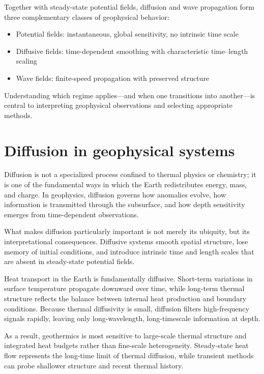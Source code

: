 Together with steady-state potential fields, diffusion and wave propagation form three complementary classes of geophysical behavior:
\begin{itemize}
    \item Potential fields: instantaneous, global sensitivity, no intrinsic time
    scale
    \item Diffusive fields: time-dependent smoothing with characteristic
    time--length scaling
    \item Wave fields: finite-speed propagation with preserved structure
\end{itemize}

Understanding which regime applies—and when one transitions into another—is central to interpreting geophysical observations and selecting appropriate methods.

\section{Diffusion in geophysical systems}

Diffusion is not a specialized process confined to thermal physics or chemistry; it is one of the fundamental ways in which the Earth redistributes energy, mass, and charge. In geophysics, diffusion governs how anomalies evolve, how information is transmitted through the subsurface, and how depth sensitivity emerges from time-dependent observations.

What makes diffusion particularly important is not merely its ubiquity, but its interpretational consequences. Diffusive systems smooth spatial structure, lose memory of initial conditions, and introduce intrinsic time and length scales that are absent in steady-state potential fields.

Heat transport in the Earth is fundamentally diffusive. Short-term variations in surface temperature propagate downward over time, while long-term thermal structure reflects the balance between internal heat production and boundary conditions. Because thermal diffusivity is small, diffusion filters high-frequency signals rapidly, leaving only long-wavelength, long-timescale information at depth.

As a result, geothermics is most sensitive to large-scale thermal structure and integrated heat budgets rather than fine-scale heterogeneity. Steady-state heat flow represents the long-time limit of thermal diffusion, while transient methods can probe shallower structure and recent thermal history.

